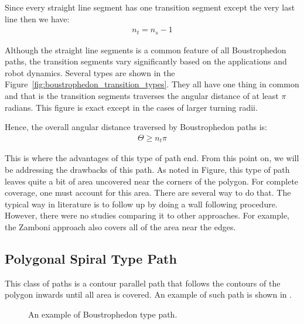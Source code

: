 \documentclass[../main.tex]{subfiles}
\begin{document}
Since every straight line segment has one transition segment except the very last line then we have:
\begin{equation}
\label{equation:boustropheon_num_transition_segments}
\begin{aligned}
	n_t=n_s-1
\end{aligned}
\end{equation}

Although the straight line segments is a common feature of all Boustrophedon paths, the transition segments vary significantly based on the applications and robot dynamics. Several types are shown in the Figure~\ref{fig:boustrophedon_transition_types}. They all have one thing in common and that is the transition segments traverses the angular distance of at least $\pi$ radians. This figure is exact except in the cases of larger turning radii. 

Hence, the overall angular distance traversed by Boustrophedon paths is:
\begin{equation}
\label{equation:boustropheon_transition_angular_distance}
\begin{aligned}
	\Theta\geq n_t\pi
\end{aligned}
\end{equation}

This is where the advantages of this type of path end. From this point on, we will be addressing the drawbacks of this path. As noted in Figure, this type of path leaves quite a bit of area uncovered near the corners of the polygon. For complete coverage, one must account for this area. There are several way to do that. The typical way in literature is to follow up by doing a wall following procedure. However, there were no studies comparing it to other approaches. For example, the Zamboni approach also covers all of the area near the edges.


\subsection{Polygonal Spiral Type Path}

This class of paths is a contour parallel path that follows the contours of the polygon inwards until all area is covered. An example of such path is shown in .

\begin{figure}
	\centering
	

	\caption{An example of Boustrophedon type path.}
	\label{fig:example_convex_boustrophedon}
\end{figure}
\end{document}
